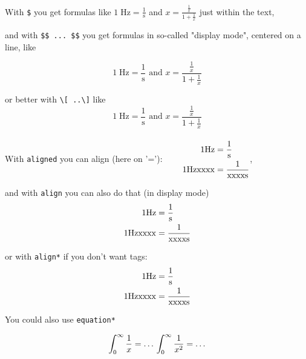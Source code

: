 \documentclass{ximera}
\begin{document}

With \verb|$| you get formulas like 
$1\;\textrm{Hz}=\frac{1}{\textrm{s}}$ and $ x =\frac{\frac1x}{1+\frac{1}{x}}$
just within the text,

and with \verb|$$ ... $$| you get formulas in so-called "display mode", centered on a line, like

$$
1\;\textrm{Hz}=\frac{1}{\textrm{s}} \text{ and } x =\frac{\frac1x}{1+\frac{1}{x}}
$$ 

or better with \verb|\[ ..\]|  like
\[
1\;\textrm{Hz}=\frac{1}{\textrm{s}} \text{ and } x =\frac{\frac1x}{1+\frac{1}{x}}
\] 
\\[1cm]
With \verb|aligned| you can align (here on '='):
$
\begin{aligned}
    \qquad 1 {\rm Hz}      & = \frac{1}{{\rm s}} \\
    \qquad 1 {\rm Hzxxxx}  & = \frac{1}{{\rm xxxxs}}
\end{aligned}
$,

and with \verb|align| you can also do that (in display mode)
\begin{align}
    1 {\rm Hz}      & = \frac{1}{{\rm s}} \\
    1 {\rm Hzxxxx}  & = \frac{1}{{\rm xxxxs}} \\
\end{align}


or with \verb|align*| if you don't want tags:
\begin{align*}
    1 {\rm Hz}      & = \frac{1}{{\rm s}} \\
    1 {\rm Hzxxxx}  & = \frac{1}{{\rm xxxxs}} \\
\end{align*}


You could also use \verb|equation*|

\begin{equation*}
    \int_0^\infty \frac{1}{x}  =  \ldots \\
    \int_0^\infty \frac{1}{x^2}  =  \ldots 
\end{equation*}

\end{document}
